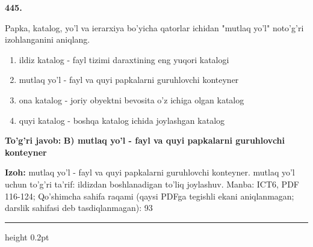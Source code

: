 \documentclass[10pt,a4paper]{article}
\begin{document}
{\bfseries\sffamily\color{ink} 445.}
\par
Papka, katalog, yo'l va ierarxiya bo'yicha qatorlar ichidan "mutlaq yo'l" noto'g'ri izohlanganini aniqlang.
\begin{enumerate}[label=\Alph*),leftmargin=9mm]
\item ildiz katalog - fayl tizimi daraxtining eng yuqori katalogi
\item mutlaq yo'l - fayl va quyi papkalarni guruhlovchi konteyner
\item ona katalog - joriy obyektni bevosita o'z ichiga olgan katalog
\item quyi katalog - boshqa katalog ichida joylashgan katalog
\end{enumerate}
\begin{tcolorbox}[enhanced,breakable,colback=teal!4,colframe=teal!60!black,boxrule=0.45pt,arc=1.2mm,left=2.7mm,right=2.7mm,top=1.8mm,bottom=1.8mm,before skip=2mm,after skip=2mm]
{\bfseries\sffamily\color{teal}To'g'ri javob:} \textbf{B) mutlaq yo'l - fayl va quyi papkalarni guruhlovchi konteyner}
\par\smallskip
{\bfseries Izoh:} mutlaq yo'l - fayl va quyi papkalarni guruhlovchi konteyner. mutlaq yo'l uchun to'g'ri ta'rif: ildizdan boshlanadigan to'liq joylashuv. Manba: ICT6, PDF 116-124; Qo'shimcha sahifa raqami (qaysi PDFga tegishli ekani aniqlanmagan; darslik sahifasi deb tasdiqlanmagan): 93
\end{tcolorbox}
\vspace{2mm}\hrule height 0.2pt\vspace{3mm}
\end{document}
